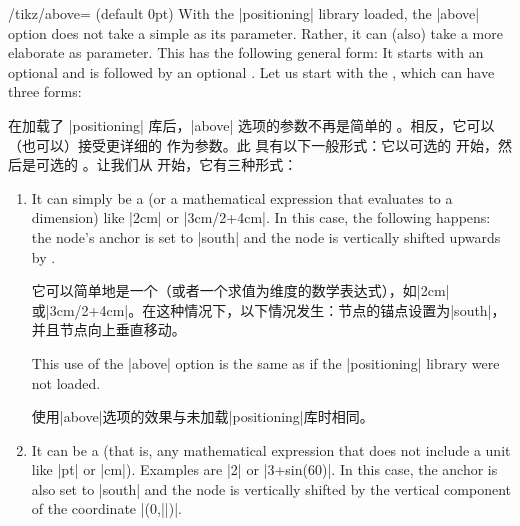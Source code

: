 \begin{key}{/tikz/above= (default 0pt)}
    With the |positioning| library loaded, the |above| option does not take a
    simple  as its parameter. Rather, it can (also) take a more
    elaborate  as parameter. This  has
    the following general form: It starts with an optional 
    and is followed by an optional . Let us start with the
    , which can have three forms:
    
    在加载了 |positioning| 库后，|above| 选项的参数不再是简单的 。相反，它可以（也可以）接受更详细的  作为参数。此  具有以下一般形式：它以可选的  开始，然后是可选的 。让我们从  开始，它有三种形式：


    \begin{enumerate}
        \item It can simply be a  (or a mathematical
            expression that evaluates to a dimension) like |2cm| or
            |3cm/2+4cm|. In this case, the following happens: the node's anchor
            is set to |south| and the node is vertically shifted upwards by
            .

            它可以简单地是一个（或者一个求值为维度的数学表达式），如|2cm|或|3cm/2+4cm|。在这种情况下，以下情况发生：节点的锚点设置为|south|，并且节点向上垂直移动。
\begin{codeexample}[]
\end{codeexample}
            This use of the |above| option is the same as if the |positioning|
            library were not loaded.

            使用|above|选项的效果与未加载|positioning|库时相同。
        \item It can be a  (that is, any mathematical
            expression that does not include a unit like |pt| or |cm|).
            Examples are |2| or |3+sin(60)|. In this case, the anchor is also
            set to |south| and the node is vertically shifted by the vertical
            component of the coordinate |(0,||)|.
            

\end{enumerate}
\end{key}
